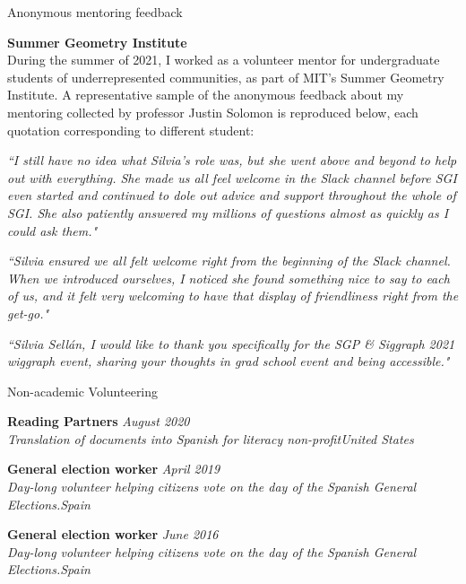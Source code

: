 \documentclass{resume} %
\begin{document}
\begin{rSection}{Anonymous mentoring feedback}

{\bf  Summer Geometry Institute} \\
During the summer of 2021, I worked as a volunteer mentor for undergraduate students of underrepresented communities, as part of MIT's Summer Geometry Institute. A representative sample of the anonymous feedback about my mentoring collected by professor Justin Solomon is reproduced below, each quotation corresponding to different student:

{\it ``I still have no idea what Silvia's role was, but she went above and beyond to help out with everything. She made us all feel welcome in the Slack channel before SGI even started and continued to dole out advice and support throughout the whole of SGI. She also patiently answered my millions of questions almost as quickly as I could ask them."}

{\it ``Silvia ensured we all felt welcome right from the beginning of the Slack channel. When we introduced ourselves, I noticed she found something nice to say to each of us, and it felt very welcoming to have that display of friendliness right from the get-go."}

{\it ``Silvia Sellán, I would like to thank you specifically for the SGP \& Siggraph 2021 wiggraph event, sharing your thoughts in grad school event and being accessible."}

\end{rSection}

\begin{rSection}{Non-academic Volunteering}

{\bf Reading Partners} \hfill {\em August 2020}\\ 
{\it Translation of documents into Spanish for literacy non-profit}\hfill {\em United States}

{\bf General election worker} \hfill {\em April 2019}\\ 
{\it Day-long volunteer helping citizens vote on the day of the Spanish General Elections.}\hfill {\em Spain}

{\bf General election worker} \hfill {\em June 2016}\\ 
{\it Day-long volunteer helping citizens vote on the day of the Spanish General Elections.}\hfill {\em Spain}



\end{rSection}





\end{document}
